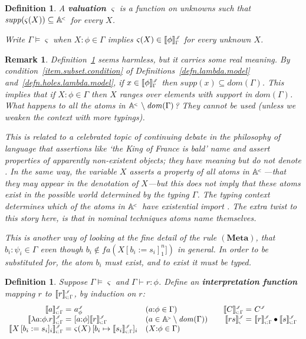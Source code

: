 \documentclass[submission,copyright]{eptcs}
\newtheorem{defn}[thrm]{Definition}
\newtheorem{rmrk}[thrm]{Remark}
\newcommand{\deffont}[1]{\textbf{#1}}
\newcommand{\f}[1]{\ensuremath{\text{$\mathit{#1}$}}}
\newcommand{\lam}[1]{\lambda{#1}.}
\newcommand{\rulefont}[1]{\ensuremath{(\mathbf{#1})}}
\newcommand{\sm}{\mapsto}
\newcommand{\ssm}{:=}
\newcommand{\dom}{\f{dom}}
\newcommand{\supp}{\f{supp}}
\newcommand{\fa}{\f{fa}}
\newcommand\den[1]{{\hspace{.00ex}\scalebox{.55}{$#1$}}}
\newcommand{\idenot}[2]{\denot{\interp I}{#1}{#2}}
\newcommand\interp[1]{\ensuremath{\mathscr #1}}
\newcommand{\denot}[3]{\llbracket #3 \rrbracket_{\scalebox{.6}{$#2$}}^\den{#1}} \newcommand{\hdenot}[1]{\denot{\interp H}{}{#1}}
\newcommand\cent{\vdash}
\newcommand\ment{\vDash}
\newcommand\atomsdown{\mathbb A^{\hspace{-.3ex}{}_{{}^<}}}
\newcommand\atomsup{\mathbb A^{\hspace{-.3ex}{}_{{}^>}\!}} \newcommand\basesort{\tau}
\begin{document}
\begin{defn}
\label{defn.holes.valuation}
A \deffont{valuation} $\varsigma$ is a function on unknowns such that $\supp(\varsigma(X))\subseteq\atomsdown$ for every $X$.

Write $\Gamma\ment\varsigma$ when $X{:}\phi\in\Gamma$ implies $\varsigma(X)\in\idenot{\Gamma}{\phi}$ for every unknown $X$.
\end{defn}

\begin{rmrk}
Definition~\ref{defn.holes.valuation} seems harmless, but it carries some real meaning.
By condition~\ref{item.subset.condition} of Definitions~\ref{defn.lambda.model} and~\ref{defn.holes.lambda.model}, if $x\in\idenot{\Gamma}{\phi}$ then $\supp(x)\subseteq\dom(\Gamma)$.
This implies that if $X{:}\phi\in\Gamma$ then $X$ ranges over elements \emph{with support in $\dom(\Gamma)$}.
What happens to all the atoms in $\atomsdown\setminus\dom(\Gamma)$?
They cannot be used (unless we weaken the context with more typings).

This is related to a celebrated topic of continuing debate in the philosophy of language that assertions like `the King of France is bald' name and assert properties of apparently non-existent objects; they have meaning but do not denote \cite{russell:ond}.
In the same way, the variable $X$ asserts a property of all atoms in $\atomsdown$---that they may appear in the denotation of $X$---but this does not imply that these atoms exist in the possible world determined by the typing $\Gamma$.
The typing context determines which of the atoms in $\atomsdown$ have \emph{existential import} \cite{lambert:exiir}.
The extra twist to this story here, is that in nominal techniques atoms name themselves. 

This is another way of looking at the fine detail of the rule \rulefont{Meta}, that $b_i{:}\psi_i\in\Gamma$ even though $b_i\not\in\fa(X[b_i{\ssm}s_i]_1^n])$ in general.
In order to be substituted for, the atom $b_i$ must exist, and to exist it must be typed. 
\end{rmrk}


\begin{defn}
\label{defn.hole.interp}
Suppose $\Gamma\ment\varsigma$ and $\Gamma\cent r:\phi$. 
Define an \deffont{interpretation function} mapping $r$ to $\idenot{\varsigma;\Gamma}{r}$, by induction on $r$:
$$
\begin{array}{r@{\ }l@{\quad}l@{\qquad}r@{\ }l}
\idenot{\varsigma;\Gamma}{a}=&a^\iden_\phi &(a{:}\phi\in\Gamma)
&
\idenot{\varsigma;\Gamma}{C}=&C^\iden
\\
\idenot{\varsigma;\Gamma}{\lam{a{:}\phi}r}=&[a{:}\phi]\idenot{\varsigma;\Gamma}{r}  &(a\in\atomsup\setminus\dom(\Gamma))
&
\idenot{\varsigma}{rs}=&\idenot{\varsigma;\Gamma}{r}\bullet\idenot{\varsigma;\Gamma}{s}
\\
\idenot{\varsigma;\Gamma}{X\,[b_i\ssm s_i]_i}=&\varsigma(X)\,[b_i\sm\idenot{\varsigma;\Gamma}{s_i}]_i 
&(X{:}\phi\in\Gamma)
\end{array}
$$
\end{defn}
\end{document}
